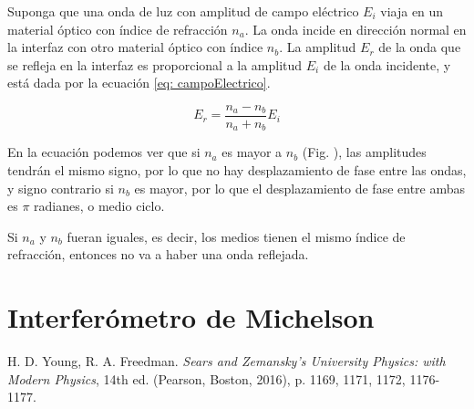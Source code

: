 \documentclass[a4paper,12pt]{article}
\begin{document}
    Suponga que una onda de luz con amplitud de campo eléctrico $E_i$ viaja en un material óptico con índice de refracción $n_a$. La onda incide en dirección normal en la interfaz con otro material óptico con índice $n_b$. La amplitud $E_r$ de la onda que se refleja en la interfaz es proporcional a la amplitud $E_i$ de la onda incidente, y está dada por la ecuación \ref{eq: campoElectrico}. \cite{Sears}

    \begin{equation}
        E_r = \frac{n_a - n_b}{n_a + n_b} E_i
        \label{eq: campoElectrico}
    \end{equation}

    En la ecuación podemos ver que si $n_a$ es mayor a $n_b$ (Fig. ), las amplitudes tendrán el mismo signo, por lo que no hay desplazamiento de fase entre las ondas, y signo contrario si $n_b$ es mayor, por lo que el desplazamiento de fase entre ambas es $\pi$ radianes, o medio ciclo.

    Si $n_a$ y $n_b$ fueran iguales, es decir, los medios tienen el mismo índice de refracción, entonces no va a haber una onda reflejada.

\section*{Interferómetro de Michelson}



\begin{thebibliography}{99}

 H. D. Young, R. A. Freedman. \emph{Sears and Zemansky's University Physics: with Modern Physics}, 14th ed. (Pearson, Boston, 2016), p. 1169, 1171, 1172, 1176-1177.

\end{thebibliography}
\end{document}

